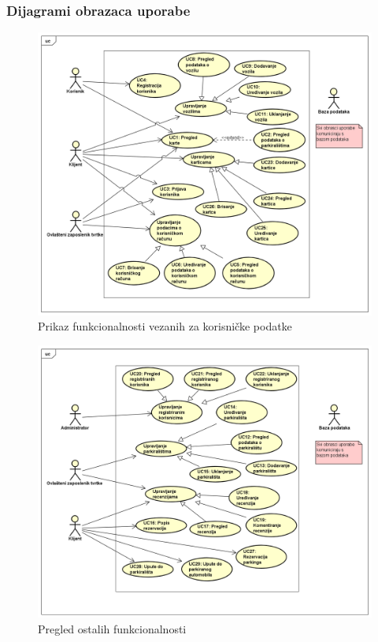 \subsubsection{Dijagrami obrazaca uporabe}
\begin{figure}[H]
	\includegraphics[width=1\linewidth]{dijagrami/Korisnički podaci.PNG} %
	\caption{Prikaz funkcionalnosti vezanih za korisničke podatke}
	\label{fig:promjene2} %
\end{figure}
\begin{figure}[H]
	\includegraphics[width=1\linewidth]{dijagrami/Pregled ostalih funkcionalnosti.PNG} %
	\caption{Pregled ostalih funkcionalnosti}
	\label{fig:promjene2} %
\end{figure}
\eject		

